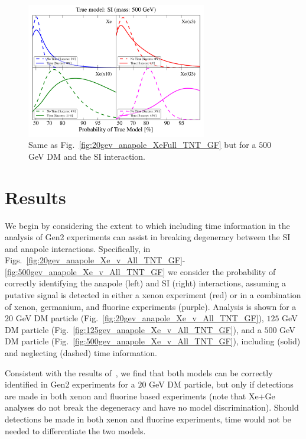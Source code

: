 \documentclass[11pt]{article}
\newcommand{\Fig}[1]{Fig.~\ref{#1}} \newcommand{\Figs}[2]{Figs.~\ref{#1} and \ref{#2}}
\begin{document}
\begin{figure}
\centering
\includegraphics[width=0.7\textwidth]{plots/PDF_500GeV_SI_Higgs_50sims_Xe_Xe3x_Xe10x_XeG3_GF_TNT.pdf}
\caption{\label{fig:500gev_SI_Higgs_XeFull_TNT_GF}
Same as Fig.~\ref{fig:20gev_anapole_XeFull_TNT_GF} but for a $500$ GeV DM and the SI interaction.}
\end{figure}






\section{Results}
We begin by considering the extent to which including time information in the analysis of Gen2 experiments can assist in breaking degeneracy between the SI and anapole interactions. Specifically, in Figs.~\ref{fig:20gev_anapole_Xe_v_All_TNT_GF}-\ref{fig:500gev_anapole_Xe_v_All_TNT_GF} we consider the probability of correctly identifying the anapole (left) and SI (right) interactions, assuming a putative signal is detected in either a xenon experiment (red) or in a combination of xenon, germanium, and fluorine experiments (purple). Analysis is shown for a $20$ GeV DM particle (\Fig{fig:20gev_anapole_Xe_v_All_TNT_GF}), $125$ GeV DM particle (\Fig{fig:125gev_anapole_Xe_v_All_TNT_GF}), and a $500$ GeV DM particle (\Fig{fig:500gev_anapole_Xe_v_All_TNT_GF}), including (solid) and neglecting (dashed) time information. 

Consistent with the results of~\cite{}, we find that both models can be correctly identified in Gen2 experiments for a $20$ GeV DM particle, but only if detections are made in both xenon and fluorine based experiments (note that Xe+Ge analyses do not break the degeneracy and have no model discrimination). Should detections be made in both xenon and fluorine experiments, time would not be needed to differentiate the two models.  
\end{document}
